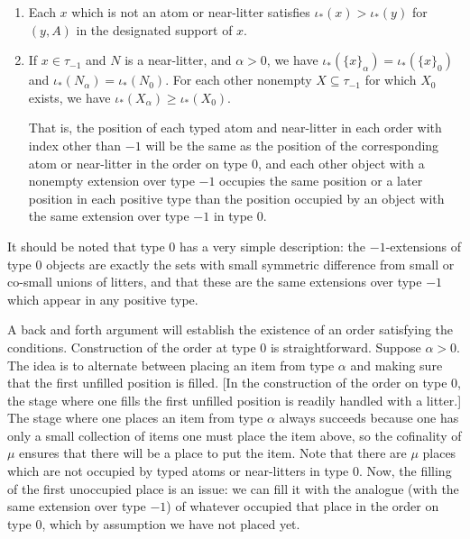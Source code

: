 \documentclass[112pt]{article}
\begin{document}
\begin{description}
\begin{enumerate}
\item Each $x$ which is not an atom or near-litter satisfies $\iota_*(x) > \iota_*(y)$ for $(y,A)$ in the designated support of $x$.

\item  If $x \in \tau_{-1}$ and $N$ is a near-litter, and $\alpha>0$, we have $\iota_*(\{x\}_\alpha) = \iota_*(\{x\}_0)$
and $\iota_*(N_\alpha) = \iota_*(N_0)$.  For each other nonempty $X \subseteq \tau_{-1}$ for which $X_0$ exists,
we have $\iota_*(X_\alpha) \geq \iota_*(X_0)$.

That is, the position of each typed atom and near-litter in each order with index other than $-1$ will be the same as the position of the corresponding atom or near-litter in the order on type 0, and each other object with a nonempty extension over type $-1$ occupies the same position or a later position in each positive type than the position occupied by an object with the same extension over type $-1$ in type 0.

\end{enumerate}

   It should be noted that type 0 has a very simple description:  the $-1$-extensions of type 0 objects are exactly the sets with small symmetric difference from small or co-small unions of litters, and that these are the same extensions over type $-1$ which appear in any positive type.

A back and forth argument will establish the existence of an order satisfying the conditions.  Construction of the order at type 0 is straightforward.  Suppose $\alpha>0$.
The idea is to alternate between placing an item from type $\alpha$ and making sure that the first unfilled position is filled.  [In the construction of the order on type 0, the stage where one fills the first unfilled position is readily handled with a litter.] The stage where one places an item from type $\alpha$ always succeeds because one has only a small collection of items one must place the item above, so the cofinality of $\mu$ ensures that there will be a place to put the item.  Note that there are $\mu$ places which are not occupied by typed atoms or near-litters in type 0.  Now, the filling of the first unoccupied place is an issue:
we can fill it with the analogue (with the same extension over type $-1$) of whatever occupied that place in the order on type 0, which by assumption we have not placed yet.  


\end{description}
\end{document}
